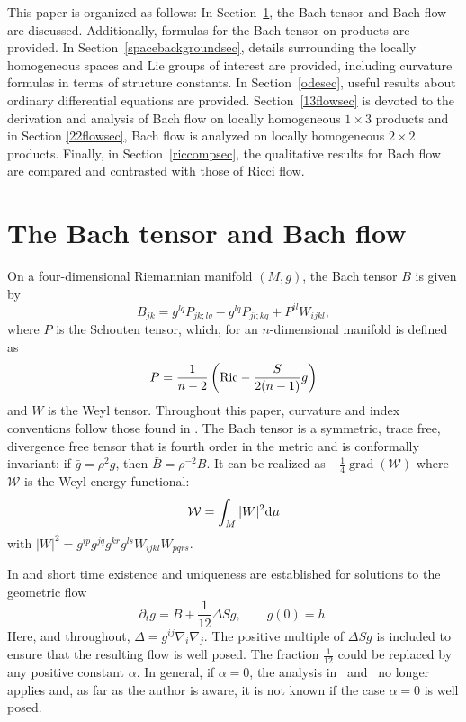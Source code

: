 \documentclass[pdftex]{sigma}
\numberwithin{equation}{section}
\newcommand{\dvar}[1]{\partial_{#1}} %
\newcommand{\grad}{\operatorname{grad}} %
\begin{document}
This paper is organized as follows: In Section~\ref{Bachbackgroundsec}, the Bach tensor and Bach flow are discussed. Additionally, formulas for the Bach tensor on products are provided. In Section~\ref{spacebackgroundsec}, details surrounding the locally homogeneous spaces and Lie groups of interest are provided, including curvature formulas in terms of structure constants. In Section~\ref{odesec}, useful results about ordinary differential equations are provided. Section~\ref{13flowsec} is devoted to the derivation and analysis of Bach flow on locally homogeneous $1 \times 3$ products and in Section \ref{22flowsec}, Bach flow is analyzed on locally homogeneous $2 \times 2$ products. Finally, in Section~\ref{riccompsec}, the qualitative results for Bach flow are compared and contrasted with those of Ricci flow.

\section{The Bach tensor and Bach flow} \label{Bachbackgroundsec}

On a four-dimensional Riemannian manifold $(M, g)$, the Bach tensor $B$ is given by
\[
B_{jk} = g^{lq} P_{jk;lq} - g^{lq} P_{jl;kq} + P^{il} W_{ijkl},
\]
where $P$ is the Schouten tensor, which, for an $n$-dimensional manifold is defined as
\[
P = \frac{1}{n-2}\left({\rm Ric}- \frac{S}{2(n-1)}g \right)
\]
and $W$ is the Weyl tensor. Throughout this paper, curvature and index conventions follow those found in \cite{Jack3}. The Bach tensor is a symmetric, trace free, divergence free tensor that is fourth order in the metric and is conformally invariant: if $\bar{g} = \rho^2 g$, then $\bar{B} = \rho^{-2} B$. It can be realized as $-\frac{1}{4} \grad(\mathcal{W})$ where $\mathcal{W}$ is the Weyl energy functional:
\[
\mathcal{W} = \int_M |W|^2 {\rm d} \mu
\]
with $|W|^2 = g^{ip} g^{jq} g^{kr} g^{ls} W_{ijkl} W_{pqrs}$.

In \cite{BahuaudHelliwell1} and \cite{BahuaudHelliwell2} short time existence and uniqueness are established for solutions to the geometric flow
\begin{equation*}
\dvar{t} g = B + \frac{1}{12} \Delta S g, \qquad g(0) = h.
\end{equation*}
Here, and throughout, $\Delta = g^{ij} \nabla_i \nabla_j$. The positive multiple of $\Delta S g$ is included to ensure that the resulting flow is well posed. The fraction $\frac{1}{12}$ could be replaced by any positive constant $\alpha$. In general, if $\alpha = 0$, the analysis in~\cite{BahuaudHelliwell1} and~\cite{BahuaudHelliwell2} no longer applies and, as far as the author is aware, it is not known if the case $\alpha = 0$ is well posed.
\end{document}
